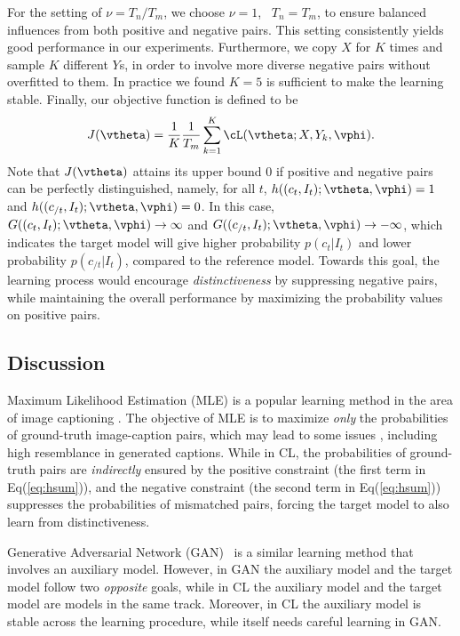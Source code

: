 For the setting of $\nu = T_n / T_m$,
we choose $\nu = 1$, \ie~$T_n = T_m$, to ensure balanced influences
from both positive and negative pairs.
This setting consistently yields good performance in our experiments.
Furthermore, we copy $X$ for $K$ times and sample $K$ different $Y$s,
in order to involve more diverse negative pairs without overfitted to them.
In practice we found $K = 5$ is sufficient to make the learning stable.
Finally, our objective function is defined to be
\begin{align}
	J(\vtheta) = \frac{1}{K} \frac{1}{T_m} \sum^K_{k = 1} \cL(\vtheta;X,Y_k,\vphi).
\end{align}
Note that $J(\vtheta)$ attains its upper bound $0$ if positive and negative pairs can be
perfectly distinguished, namely,
for all $t$, $h((c_t,I_t); \vtheta, \vphi) = 1$ and $h((c_{/t}, I_t); \vtheta, \vphi) = 0$.
In this case, $G((c_t, I_t);\vtheta, \vphi) \to \infty$ and $G((c_{/t},I_t); \vtheta, \vphi) \to -\infty$,
which indicates the target model will give higher probability $p(c_t|I_t)$ and lower probability $p(c_{/t}|I_t)$,
compared to the reference model.
%
Towards this goal, the learning process would encourage \emph{distinctiveness} by suppressing
negative pairs, while maintaining the overall performance by maximizing the probability values
on positive pairs.

\subsection{Discussion}
\label{sec:discuss}
Maximum Likelihood Estimation (MLE) is a popular learning method in the area of image captioning \cite{vinyals2015show, xu2015show, lu2016knowing}.
The objective of MLE is to maximize \emph{only} the probabilities of ground-truth image-caption pairs,
which may lead to some issues \cite{dai2017towards},
including high resemblance in generated captions.
While in CL, the probabilities of ground-truth pairs are \emph{indirectly} ensured by the positive constraint
(the first term in Eq(\ref{eq:hsum})),
and the negative constraint (the second term in Eq(\ref{eq:hsum}))
suppresses the probabilities of mismatched pairs,
forcing the target model to also learn from distinctiveness.

Generative Adversarial Network (GAN) \cite{dai2017towards}~is a similar learning method that involves an auxiliary model.
However, in GAN the auxiliary model and the target model follow two \emph{opposite} goals,
while in CL the auxiliary model and the target model are models in the same track.
Moreover, in CL the auxiliary model is stable across the learning procedure,
while itself needs careful learning in GAN.

